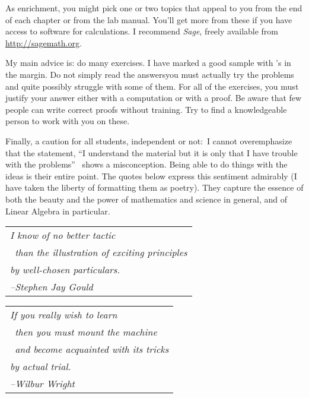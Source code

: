 {As enrichment, you might pick one or two topics that appeal to you 
from the end of each chapter or from the lab manual.
You'll get more from these
if you have access to software for calculations.
I recommend \textit{Sage}, freely available 
from \url{http://sagemath.org}.

My main advice is: do many exercises.
I have marked a good sample with \recommendationmark's in the margin.
Do not simply read the answers\Dash you must actually
try the problems and quite possibly struggle with some of them.
For all of the exercises, you must justify your answer either with a computation
or with a proof.
Be aware that few people can write correct proofs without training.
Try to find a knowledgeable person to work with you on these.

\medskip
Finally, a caution for all students, independent or not:~I 
cannot overemphasize that the 
statement, ``I understand the material but it is only 
that I have trouble with the problems''\ %
shows a misconception.
Being able to do things with the ideas is their entire point.
The quotes below express this sentiment admirably
(I have taken the liberty of formatting them as poetry).
They capture the essence of both the beauty and the power
of mathematics and science in general, 
and of Linear Algebra in particular.

\bigskip
\par\noindent\begin{tabular}[t]{@{}l@{}}
  \textit{I know of no better tactic}                     \\
  \textit{\ than the illustration of exciting principles} \\
  \textit{by well-chosen particulars.}                    \\
  \hspace*{1in}\textit{--Stephen Jay Gould}
\end{tabular}

\bigskip
\par\noindent
\begin{tabular}[t]{@{}l@{}}   
\textit{If you really wish to learn}                     \\
   \textit{\ then you must mount the machine}  \\ 
   \textit{\ and become acquainted with its tricks} \\
   \textit{by actual trial.}                    \\
   \hspace*{1in}\textit{--Wilbur Wright}
\end{tabular}

}

